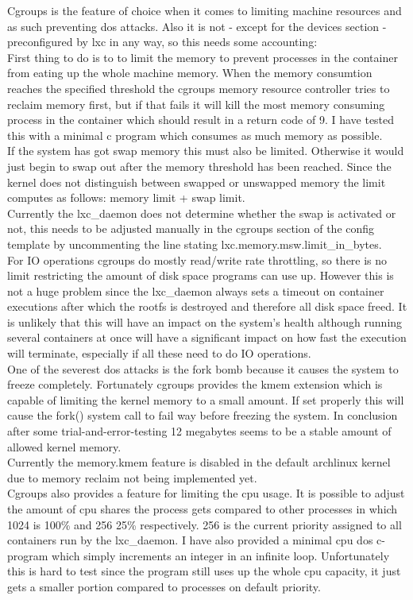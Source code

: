 Cgroups is the feature of choice when it comes to limiting machine resources and as such preventing dos attacks.
Also it is not - except for the devices section - preconfigured by lxc in any way, so this needs some accounting:\\
First thing to do is to to limit the memory to prevent processes in the container from eating up the whole machine memory.
When the memory consumtion reaches the specified threshold the cgroups memory resource controller tries to reclaim memory first,
but if that fails it will kill the most memory consuming process in the container which should result in a return code of 9\cite{cgrpmem}.
I have tested this with a minimal c program which consumes as much memory as possible.\\
If the system has got swap memory this must also be limited. Otherwise it would just begin to swap out after the memory
threshold has been reached. Since the kernel does not distinguish between swapped or unswapped memory the limit computes as follows:
memory limit + swap limit.\\
Currently the lxc\_daemon does not determine whether the swap is activated or not, this needs to be adjusted manually in the cgroups
section of the config template by uncommenting the line stating lxc.memory.msw.limit\_in\_bytes.\\
For IO operations cgroups do mostly read/write rate throttling, so there is no limit restricting the amount of disk space programs
can use up. However this is not a huge problem since the lxc\_daemon always sets a timeout on container executions after which the
rootfs is destroyed and therefore all disk space freed. It is unlikely that this will have an impact on the system's health although
running several containers at once will have a significant impact on how fast the execution will terminate, especially if all these
need to do IO operations.\\
One of the severest dos attacks is the fork bomb because it causes the system to freeze completely\cite{forkbomb}. Fortunately cgroups provides
the kmem extension which is capable of limiting the kernel memory to a small amount. If set properly this will cause the fork()
system call to fail way before freezing the system. In conclusion after some trial-and-error-testing 12 megabytes seems to be a
stable amount of allowed kernel memory.\\
Currently the memory.kmem feature is disabled in the default archlinux kernel due to memory reclaim not being implemented yet\cite{kmembug}.\\
Cgroups also provides a feature for limiting the cpu usage. It is possible to adjust the amount of cpu shares the process gets compared to
other processes in which 1024 is 100\% and 256 25\% respectively. 256 is the current priority assigned to all containers run by the lxc\_daemon.
I have also provided a minimal cpu dos c-program which simply increments an integer in an infinite loop. Unfortunately this is hard to test
since the program still uses up the whole cpu capacity, it just gets a smaller portion compared to processes on default priority.

